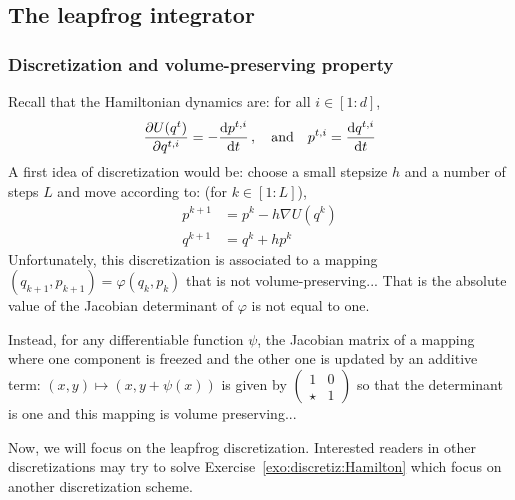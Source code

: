 \documentclass[english,graybox,envcountchap,envcountsame,sectrefs,shortlabels]{svmono}
\theoremstyle{style}
\begin{document}
\subsection{The leapfrog integrator}
\subsubsection{Discretization and volume-preserving property}
Recall that the Hamiltonian dynamics are: for all $i \in [1:d]$,
$$
\frac{\partial U(q^t)}{\partial q^{t,i}}=-\frac{\mathrm{d} p^{t,i}}{\mathrm{d} t}\,,  \quad \mbox{and} \quad
p^{t,i}=\frac{\mathrm{d} q^{t,i}}{\mathrm{d} t}
$$
A first idea of discretization would be:  choose a small stepsize $h$ and a number of steps $L$ and move according to: (for $k \in[1:L]$),
\begin{align*}
p^{k+1}&=p^{k}-h \nabla U (q^{k})\\
q^{k+1}&=q^k+h p^{k}
\end{align*}
Unfortunately, this discretization is associated to a mapping $(q_{k+1},p_{k+1})=\varphi(q_k,p_k)$ that is not volume-preserving... That is the absolute value of the Jacobian determinant of $\varphi$ is not equal to one.

Instead, for any differentiable function $\psi$, the Jacobian matrix of a mapping where one component is freezed and the other one is updated by an additive term: $(x,y) \mapsto (x,y+\psi(x))$ is given by $\begin{pmatrix}
1 &0\\
\star & 1
\end{pmatrix}$  so that the determinant is one and this mapping is volume preserving...

Now, we will focus on the leapfrog discretization. Interested readers in other discretizations may try to solve Exercise~\ref{exo:discretiz:Hamilton}  which focus on another discretization scheme.
\end{document}
